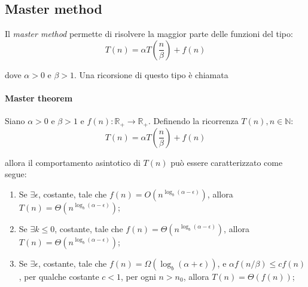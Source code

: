 \documentclass{article}
\begin{document}
\subsection{Master method}
Il \textit{master method} permette di risolvere la maggior parte delle funzioni
del tipo: 
\begin{equation}
    T(n) = \alpha T(\frac{n}{\beta}) + f(n)
\end{equation}

dove $\alpha > 0 $ e $\beta > 1 $. Una ricorsione di questo tipo è chiamata

\paragraph{Master theorem} Siano $ \alpha > 0 $ e $ \beta > 1 $ e $f(n):
\mathbb{R}_+ \rightarrow \mathbb{R}_+$. Definendo la ricorrenza $T(n), n \in
\mathbb{N}$:
\begin{equation}
    T(n) = \alpha T(\frac{n}{\beta}) + f(n)
\end{equation}

allora il comportamento asintotico di $T(n)$ può essere caratterizzato come
segue:
\begin{enumerate}
    \item Se $\exists \epsilon $, costante, tale che $f(n) = O(n^{\log_b(\alpha -
        \epsilon)})$, allora $T(n) = \Theta(n^{\log_b(\alpha -
        \epsilon)})$;

    \item Se $\exists k \leq 0 $, costante, tale che $f(n) = \Theta(n^{\log_b(\alpha -
        \epsilon)})$, allora $T(n) = \Theta(n^{\log_b(\alpha - \epsilon)})$;


    \item Se $\exists \epsilon $, costante, tale che $f(n) = \Omega({\log_b(\alpha +
        \epsilon)})$, e $\alpha f(n/ \beta) \leq cf(n) $, per qualche costante
        $c< 1$, per ogni $n>n_0$, allora $T(n) = \Theta(f(n))$;

\end{enumerate}
\end{document}
